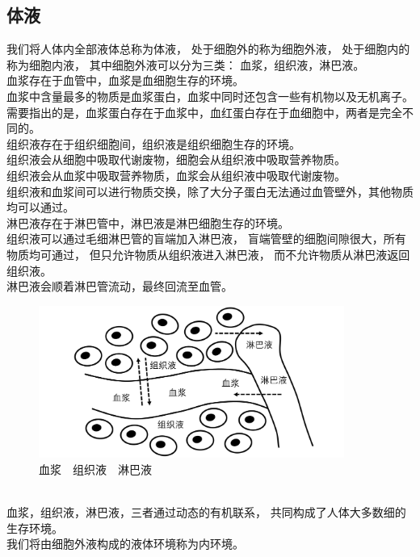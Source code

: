\documentclass[UTF8]{ctexart}
\begin{document}
\subsection{体液}
    我们将人体内全部液体总称为体液，
    处于细胞外的称为细胞外液，
    处于细胞内的称为细胞内液，
    其中细胞外液可以分为三类：
    血浆，组织液，淋巴液。\\[6mm]
    血浆存在于血管中，血浆是血细胞生存的环境。\\[3mm]
    血浆中含量最多的物质是血浆蛋白，血浆中同时还包含一些有机物以及无机离子。\\[3mm]
    需要指出的是，血浆蛋白存在于血浆中，血红蛋白存在于血细胞中，两者是完全不同的。\\[6mm]
    组织液存在于组织细胞间，组织液是组织细胞生存的环境。\\[3mm]
    组织液会从细胞中吸取代谢废物，细胞会从组织液中吸取营养物质。\\[3mm]
    组织液会从血浆中吸取营养物质，血浆会从组织液中吸取代谢废物。\\[3mm]
    组织液和血浆间可以进行物质交换，除了大分子蛋白无法通过血管壁外，其他物质均可以通过。\\[6mm]
    淋巴液存在于淋巴管中，淋巴液是淋巴细胞生存的环境。\\[3mm]
    组织液可以通过毛细淋巴管的盲端加入淋巴液，
    盲端管壁的细胞间隙很大，所有物质均可通过，
    但只允许物质从组织液进入淋巴液，
    而不允许物质从淋巴液返回组织液。\\[3mm]
    淋巴液会顺着淋巴管流动，最终回流至血管。\\
    \begin{figure}[h]
        \begin{center}
            \includegraphics[width=10cm]{BiologyImage/52.jpg}
        \end{center}
        \caption{血浆~~组织液~~淋巴液}
    \end{figure}\\
    血浆，组织液，淋巴液，三者通过动态的有机联系，
    共同构成了人体大多数细的生存环境。\\[3mm]
    我们将由细胞外液构成的液体环境称为内环境。
\end{document}
